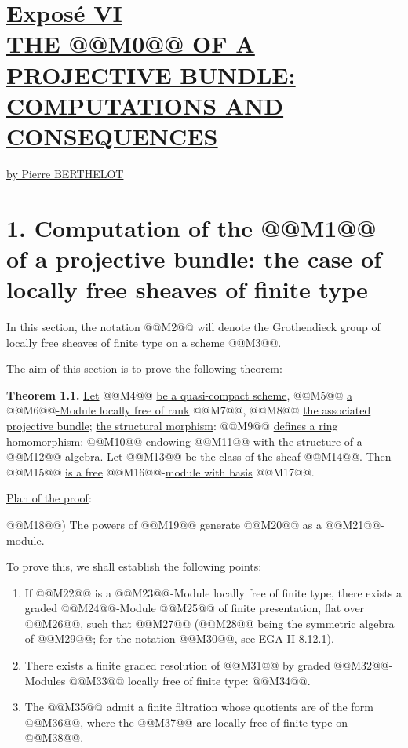 \section*{\underline{Exposé VI}\\[3pt] \underline{\underline{THE @@M0@@ OF A PROJECTIVE BUNDLE:}}\\[3pt] \underline{\underline{COMPUTATIONS AND CONSEQUENCES}}}
\renewcommand{\Sym}{\mathbf{S}}
\renewcommand{\Projz}{\underline{\operatorname{Proj}}_0}
\begin{center}
\underline{by Pierre BERTHELOT}
\end{center}

\section*{1. Computation of the @@M1@@ of a projective bundle: the case of locally free sheaves of finite type}

In this section, the notation @@M2@@ will denote the Grothendieck group of locally free sheaves of finite type on a scheme @@M3@@.

The aim of this section is to prove the following theorem:

\textbf{Theorem 1.1.} \uline{Let} @@M4@@ \uline{be a quasi-compact scheme}, @@M5@@ \uline{a} @@M6@@\uline{-Module locally free of rank} @@M7@@, @@M8@@ \uline{the associated projective bundle}; \uline{the structural morphism}: @@M9@@ \uline{defines a ring homomorphism}: @@M10@@ \uline{endowing} @@M11@@ \uline{with the structure of a} @@M12@@-\uline{algebra}. \uline{Let} @@M13@@ \uline{be the class of the sheaf} @@M14@@. \uline{Then} @@M15@@ \uline{is a free} @@M16@@-\uline{module with basis} @@M17@@.

\uline{Plan of the proof}:

@@M18@@) The powers of @@M19@@ generate @@M20@@ as a @@M21@@-module.

To prove this, we shall establish the following points:

\begin{enumerate}[label=\alph*)]
\item If @@M22@@ is a @@M23@@-Module locally free of finite type, there exists a graded @@M24@@-Module @@M25@@ of finite presentation, flat over @@M26@@, such that @@M27@@ (@@M28@@ being the symmetric algebra of @@M29@@; for the notation @@M30@@, see EGA II 8.12.1).

\item There exists a finite graded resolution of @@M31@@ by graded @@M32@@-Modules @@M33@@ locally free of finite type: @@M34@@.

\item The @@M35@@ admit a finite filtration whose quotients are of the form @@M36@@, where the @@M37@@ are locally free of finite type on @@M38@@.
\end{enumerate}

